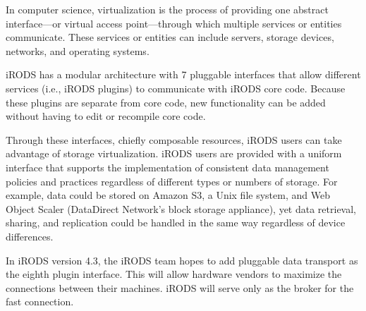 \documentclass[10pt,oneside]{memoir}
\begin{document}
In computer science, virtualization is the process of providing one abstract interface---or virtual access point---through which multiple services or entities communicate. These services or entities can include servers, storage devices, networks, and operating systems.

iRODS has a modular architecture with 7 pluggable interfaces that allow different services (i.e., iRODS plugins) to communicate with iRODS core code. Because these plugins are separate from core code, new functionality can be added without having to edit or recompile core code.

Through these interfaces, chiefly composable resources, iRODS users can take advantage of storage virtualization. iRODS users are provided with a uniform interface that supports the implementation of consistent data management policies and practices regardless of different types or numbers of storage. For example, data could be stored on Amazon S3, a Unix file system, and Web Object Scaler (DataDirect Network's block storage appliance), yet data retrieval, sharing, and replication could be handled in the same way regardless of device differences.

In iRODS version 4.3, the iRODS team hopes to add pluggable data transport as the eighth plugin interface.  This will allow hardware vendors to maximize the connections between their machines.  iRODS will serve only as the broker for the fast connection.
\end{document}
